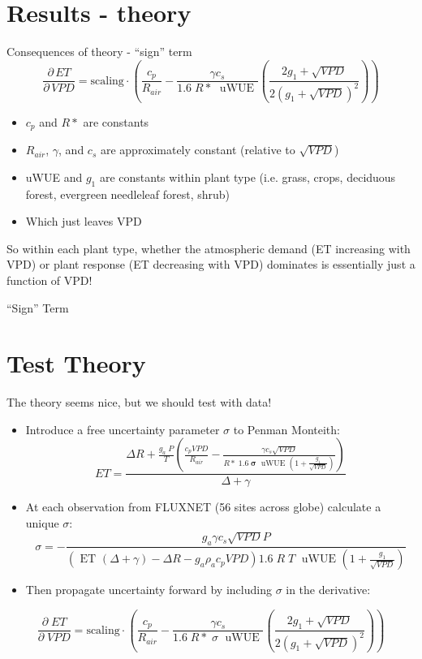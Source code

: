 \documentclass{beamer}
\begin{document}
\section{Results - theory}
\begin{frame}{Consequences of theory - ``sign'' term}
  \[\frac{\partial \, ET}{\partial \, VPD} = \text{scaling} \cdot \left(\frac{ c_p}{R_{air}} - \frac{\gamma c_s }{1.6 \; R*\; \text{ uWUE }} \left( \frac{2 g_1 + \sqrt{VPD}}{2 (g_1 + \sqrt{VPD})^2}\right) \right)\]
  \begin{itemize}
  \item $c_p$ and $R*$ are constants
  \item $R_{air}$, $\gamma$, and $c_s$ are approximately constant (relative to $\sqrt{VPD}$)
  \item uWUE and $g_1$ are constants within plant type (i.e. grass, crops, deciduous forest, evergreen needleleaf forest, shrub)
  \item Which just leaves VPD
  \end{itemize}
  So within each plant type, whether the atmospheric demand (ET increasing with VPD) or plant response (ET decreasing with VPD) dominates is essentially just a function of VPD!
\end{frame}

\begin{frame}{``Sign'' Term}
  \begin{figure}
  \end{figure}
\end{frame}


\section{Test Theory}
\begin{frame}{The theory seems nice, but we should test with data!}
    \begin{itemize}
    \item Introduce a free uncertainty parameter $\sigma$ to Penman Monteith:
      \[ET = \frac{\Delta R + \frac{g_a\; P}{T} \left( \frac{ c_p VPD}{R_{air}} -  \frac{\gamma c_s \sqrt{VPD} }{ R* \; 1.6\; \boldsymbol{\sigma} \; \text{ uWUE } (1 + \frac{g_1}{\sqrt{VPD}})} \right) }{ \Delta + \gamma}\]
    \item At each observation from FLUXNET (56 sites across globe) calculate a unique $\sigma$:
      \small
      \[\sigma = - \frac{g_a \gamma c_s \sqrt{VPD} P }{ \left(\text{ ET } ( \Delta + \gamma) - \Delta R - g_a \rho_a c_p VPD\right) 1.6 \; R\; T\; \text{ uWUE } (1 + \frac{g_1}{\sqrt{VPD}})}\]
      \normalsize
    \item Then propagate uncertainty forward by including $\sigma$ in the derivative:
    \end{itemize}
      \[\frac{\partial \;  ET}{\partial \; VPD} = \text{scaling} \cdot \left(\frac{ c_p}{R_{air}} -  \frac{\gamma c_s }{1.6 \; R*\; \sigma \; \text{ uWUE }} \left( \frac{2 g_1 + \sqrt{VPD}}{2 (g_1 + \sqrt{VPD})^2}\right) \right)\]

  \end{frame}
  
\end{document}

